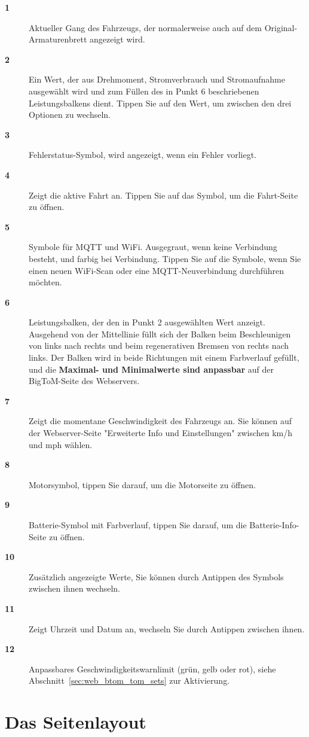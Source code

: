 \begin{description}
\item[\textbf{1}] Aktueller Gang des Fahrzeugs, der normalerweise auch auf dem Original-Armaturenbrett angezeigt wird.
\item[\textbf{2}] Ein Wert, der aus Drehmoment, Stromverbrauch und Stromaufnahme ausgewählt wird und zum Füllen des in Punkt 6 beschriebenen Leistungsbalkens dient. Tippen Sie auf den Wert, um zwischen den drei Optionen zu wechseln.
\item[\textbf{3}] Fehlerstatus-Symbol, wird angezeigt, wenn ein Fehler vorliegt.
\item[\textbf{4}] Zeigt die aktive Fahrt an. Tippen Sie auf das Symbol, um die Fahrt-Seite zu öffnen.
\item[\textbf{5}] Symbole für MQTT und WiFi. Ausgegraut, wenn keine Verbindung besteht, und farbig bei Verbindung. Tippen Sie auf die Symbole, wenn Sie einen neuen WiFi-Scan oder eine MQTT-Neuverbindung durchführen möchten.
\item[\textbf{6}] Leistungsbalken, der den in Punkt 2 ausgewählten Wert anzeigt. Ausgehend von der Mittellinie füllt sich der Balken beim Beschleunigen von links nach rechts und beim regenerativen Bremsen von rechts nach links. Der Balken wird in beide Richtungen mit einem Farbverlauf gefüllt, und die \textbf{Maximal- und Minimalwerte sind anpassbar} auf der BigToM-Seite des Webservers.
\item[\textbf{7}] Zeigt die momentane Geschwindigkeit des Fahrzeugs an. Sie können auf der Webserver-Seite "Erweiterte Info und Einstellungen" zwischen km/h und mph wählen.
\item[\textbf{8}] Motorsymbol, tippen Sie darauf, um die Motorseite zu öffnen.
\item[\textbf{9}] Batterie-Symbol mit Farbverlauf, tippen Sie darauf, um die Batterie-Info-Seite zu öffnen.
\item[\textbf{10}] Zusätzlich angezeigte Werte, Sie können durch Antippen des Symbols zwischen ihnen wechseln.
\item[\textbf{11}] Zeigt Uhrzeit und Datum an, wechseln Sie durch Antippen zwischen ihnen.
\item[\textbf{12}] Anpassbares Geschwindigkeitswarnlimit (grün, gelb oder rot), siehe Abschnitt~\ref{sec:web_btom_tom_sets} zur Aktivierung.
\end{description}

\section{Das Seitenlayout}
\label{sec:main-layout}

